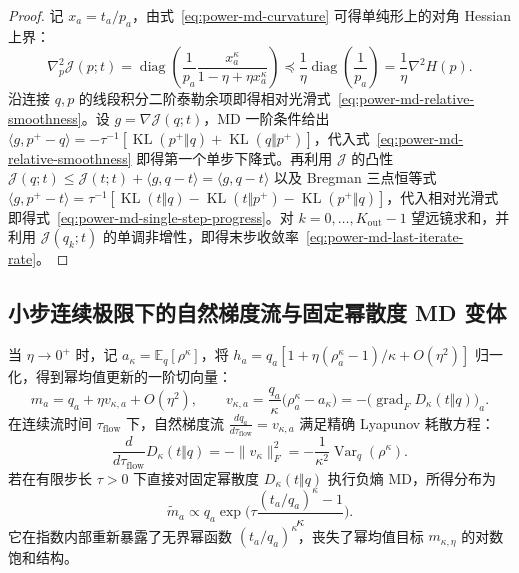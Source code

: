 \documentclass[lang=cn,scheme=chinese,openany]{elegantbook}
\newcommand{\E}{\mathbb E}
\newcommand{\KL}{\operatorname{KL}}
\newcommand{\Var}{\operatorname{Var}}
\begin{document}
\begin{proof}
记 $x_a=t_a/p_a$，由式~\eqref{eq:power-md-curvature} 可得单纯形上的对角 Hessian 上界：
\begin{equation}
 \nabla_p^2\mathcal J(p;t)
 =\operatorname{diag}\left(\frac1{p_a}
       \frac{x_a^\kappa}{1-\eta+\eta x_a^\kappa}\right)
 \preceq\frac1\eta\operatorname{diag}\left(\frac1{p_a}\right)
 =\frac1\eta\nabla^2 H(p).
 \label{eq:power-md-hessian-bound}
\end{equation}
沿连接 $q,p$ 的线段积分二阶泰勒余项即得相对光滑式~\eqref{eq:power-md-relative-smoothness}。设 $g=\nabla\mathcal J(q;t)$，MD 一阶条件给出 $\langle g,p^+-q\rangle=-\tau^{-1}[\KL(p^+\Vert q)+\KL(q\Vert p^+)]$，代入式~\eqref{eq:power-md-relative-smoothness} 即得第一个单步下降式。再利用 $\mathcal J$ 的凸性 $\mathcal J(q;t)\le\mathcal J(t;t)+\langle g,q-t\rangle=\langle g,q-t\rangle$ 以及 Bregman 三点恒等式 $\langle g,p^+-t\rangle=\tau^{-1}[\KL(t\Vert q)-\KL(t\Vert p^+)-\KL(p^+\Vert q)]$，代入相对光滑式即得式~\eqref{eq:power-md-single-step-progress}。对 $k=0,\ldots,K_{\mathrm{out}}-1$ 望远镜求和，并利用 $\mathcal J(q_k;t)$ 的单调非增性，即得末步收敛率~\eqref{eq:power-md-last-iterate-rate}。
\end{proof}

\subsection{小步连续极限下的自然梯度流与固定幂散度 MD 变体}

当 $\eta\to 0^+$ 时，记 $a_\kappa=\E_q[\rho^\kappa]$，将 $h_a=q_a[1+\eta(\rho_a^\kappa-1)/\kappa+O(\eta^2)]$ 归一化，得到幂均值更新的一阶切向量：
\begin{equation}
 m_a=q_a+\eta v_{\kappa,a}+O(\eta^2),\qquad
 v_{\kappa,a}=\frac{q_a}{\kappa}\bigl(\rho_a^\kappa-a_\kappa\bigr)
 =-\bigl(\operatorname{grad}_{\!F} D_\kappa(t\Vert q)\bigr)_a.
 \label{eq:proximal-natural-velocity}
\end{equation}
在连续流时间 $\tau_{\mathrm{flow}}$ 下，自然梯度流 $\frac{dq_a}{d\tau_{\mathrm{flow}}}=v_{\kappa,a}$ 满足精确 Lyapunov 耗散方程：
\begin{equation}
 \frac{d}{d\tau_{\mathrm{flow}}}D_\kappa(t\Vert q)
 =-\|v_\kappa\|_F^2
 =-\frac1{\kappa^2}\Var_q(\rho^\kappa).
 \label{eq:proximal-flow-lyapunov}
\end{equation}
若在有限步长 $\tau>0$ 下直接对固定幂散度 $D_\kappa(t\Vert q)$ 执行负熵 MD，所得分布为
\begin{equation*}
\widetilde m_a\propto q_a\exp\biggl(\tau\frac{(t_a/q_a)^\kappa-1}{\kappa}\biggr).
\end{equation*}
它在指数内部重新暴露了无界幂函数 $(t_a/q_a)^\kappa$，丧失了幂均值目标 $m_{\kappa,\eta}$ 的对数饱和结构。
\end{document}

